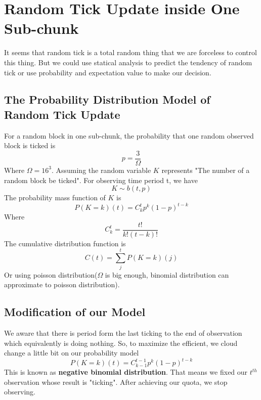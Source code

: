 \documentclass[UTF8,a4paper,15pt,titlepage,scale=0.8]{article}
\begin{document}
\section{Random Tick Update inside One Sub-chunk}
    It seems that random tick is a total random thing that we are forceless to control this thing. But we could use statical analysis to predict the tendency of random tick or use probability and expectation value to make our decision.
    \subsection{The Probability Distribution Model of Random Tick Update}
        For a random block in one sub-chunk, the probability that one random observed block is ticked is 
            \begin{equation}
                p = \frac{3}{\Omega}
            \end{equation}
        Where $\Omega = 16^3$. Assuming the random variable $K$ represents "The number of a random block be ticked". For observing time period t, we have 
            \begin{equation}
                K \sim b(t,p)
            \end{equation}
        The probability mass function of $K$ is
            \begin{equation}
                P(K=k)(t) = C_k^{t}p^{k}(1-p)^{t-k}
            \end{equation}
        Where 
            \begin{equation}
                C_k^t = \frac{t !}{k !(t-k) !}
            \end{equation}
        The cumulative distribution function is
            \begin{equation}
                C(t) = \sum_j^{t}P(K=k)(j)
            \end{equation}
        Or using poisson distribution($\Omega$ is big enough, binomial distribution can approximate to poisson distribution).
    \subsection{Modification of our Model}
        We aware that there is period form the last ticking to the end of observation which equivalently is doing nothing. So, to maximize the efficient, we cloud change a little bit on our probability model
            \begin{equation}
                P(K=k)(t) = C^{t-1}_{k-1}p^k(1-p)^{t-k}
            \end{equation}
        This is known as \textbf{negative binomial distribution}. That means we fixed our $t^{th}$ observation whose result is "ticking". After achieving our quota, we stop observing. 
\end{document}
